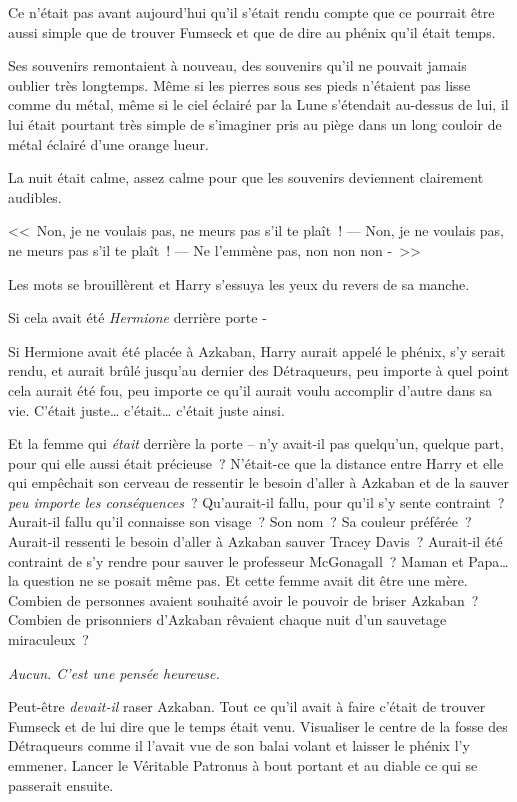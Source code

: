 Ce n'était pas avant aujourd'hui qu'il s'était rendu compte que ce pourrait être aussi simple que de trouver Fumseck et que de dire au phénix qu'il était temps.

Ses souvenirs remontaient à nouveau, des souvenirs qu'il ne pouvait jamais oublier très longtemps. Même si les pierres sous ses pieds n'étaient pas lisse comme du métal, même si le ciel éclairé par la Lune s'étendait au-dessus de lui, il lui était pourtant très simple de s'imaginer pris au piège dans un long couloir de métal éclairé d'une orange lueur.

La nuit était calme, assez calme pour que les souvenirs deviennent clairement audibles.

<<~Non, je ne voulais pas, ne meurs pas s'il te plaît~!
---  Non, je ne voulais pas, ne meurs pas s'il te plaît~!
---  Ne l'emmène pas, non non non -~>>

Les mots se brouillèrent et Harry s'essuya les yeux du revers de sa manche.

Si cela avait été \emph{Hermione} derrière porte -

Si Hermione avait été placée à Azkaban, Harry aurait appelé le phénix, s'y serait rendu, et aurait brûlé jusqu'au dernier des Détraqueurs, peu importe à quel point cela aurait été fou, peu importe ce qu'il aurait voulu accomplir d'autre dans sa vie. C'était juste… c'était… c'était juste ainsi.

Et la femme qui \emph{était} derrière la porte -- n'y avait-il pas quelqu'un, quelque part, pour qui elle aussi était précieuse~? N'était-ce que la distance entre Harry et elle qui empêchait son cerveau de ressentir le besoin d'aller à Azkaban et de la sauver \emph{peu importe les conséquences}~? Qu'aurait-il fallu, pour qu'il s'y sente contraint~? Aurait-il fallu qu'il connaisse son visage~? Son nom~? Sa couleur préférée~? Aurait-il ressenti le besoin d'aller à Azkaban sauver Tracey Davis~? Aurait-il été contraint de s'y rendre pour sauver le professeur McGonagall~? Maman et Papa… la question ne se posait même pas. Et cette femme avait dit être une mère. Combien de personnes avaient souhaité avoir le pouvoir de briser Azkaban~? Combien de prisonniers d'Azkaban rêvaient chaque nuit d'un sauvetage miraculeux~?

\emph{Aucun. C'est une pensée heureuse.}

Peut-être \emph{devait-il} raser Azkaban. Tout ce qu'il avait à faire c'était de trouver Fumseck et de lui dire que le temps était venu. Visualiser le centre de la fosse des Détraqueurs comme il l'avait vue de son balai volant et laisser le phénix l'y emmener. Lancer le Véritable Patronus à bout portant et au diable ce qui se passerait ensuite.

